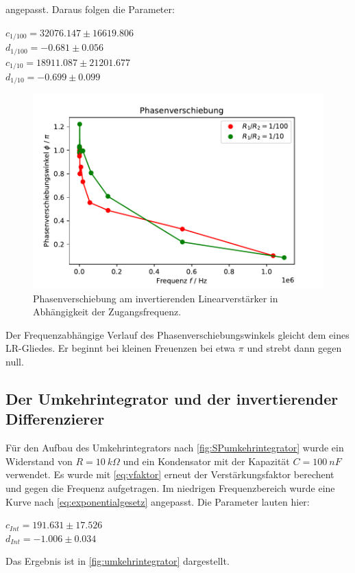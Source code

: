   angepasst. Daraus folgen die Parameter:
  \begin{center}
    $c_{1/100} = 32076.147  \pm 16619.806$\\
    $d_{1/100} =   -0.681 \pm 0.056$\\
    $c_{1/10} = 18911.087 \pm 21201.677$\\
    $d_{1/10} =   -0.699 \pm 0.099$\\
  \end{center}
  \begin{figure}
    \centering
    \includegraphics{content/grafiken/phasenverschiebung.pdf}
    \caption{Phasenverschiebung am invertierenden Linearverstärker in Abhängigkeit der Zugangsfrequenz.}
    \label{fig:phasenverschiebung}
  \end{figure}
Der Frequenzabhängige Verlauf des Phasenverschiebungswinkels gleicht dem eines LR-Gliedes. Er beginnt bei kleinen
Freuenzen bei etwa $\pi$ und strebt dann gegen null.


\subsection{Der Umkehrintegrator und der invertierender Differenzierer}
\label{sec:umkehrintegrator}
Für den Aufbau des Umkehrintegrators nach \autoref{fig:SPumkehrintegrator} wurde ein Widerstand von 
$R=\SI[]{10}[]{k\Omega}$ und ein Kondensator mit der Kapazität $C=\SI[]{100}[]{nF}$ verwendet. 
Es wurde mit \autoref{eq:vfaktor} erneut der Verstärkungsfaktor berechent und gegen die Frequenz aufgetragen.
Im niedrigen Frequenzbereich wurde eine Kurve nach \autoref{eq:exponentialgesetz} angepasst. Die Parameter 
lauten hier:
\begin{center}
    $c_{Int} =  191.631 \pm 17.526$\\
    $d_{Int} =   -1.006 \pm 0.034$\\
\end{center}
Das Ergebnis ist in \autoref{fig:umkehrintegrator} dargestellt. 

